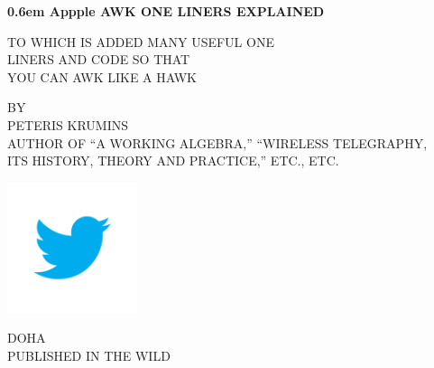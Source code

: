 \documentclass{book}
\begin{document}
\clearpage
\newcommand\nbvspace[1][3]{\vspace*{\stretch{#1}}}
\newcommand\nbstretchyspace{\spaceskip0.5em plus 0.25em minus 0.25em}
\newcommand{\nbtitlestretch}{\spaceskip0.6em}
\pagestyle{empty}
\begin{center}
\bfseries
\nbvspace[1]
\Huge
{\nbtitlestretch\huge
Appple AWK ONE LINERS EXPLAINED}
\nbvspace[1]

\normalsize
TO WHICH IS ADDED MANY USEFUL ONE\\
LINERS AND CODE SO THAT\\
YOU CAN AWK LIKE A HAWK
\nbvspace[1]

\small BY\\
\Large PETERIS KRUMINS\\[0.5em]
\footnotesize AUTHOR OF ``A WORKING ALGEBRA,'' ``WIRELESS TELEGRAPHY,\\
ITS HISTORY, THEORY AND PRACTICE,'' ETC., ETC.

\nbvspace[2]
\includegraphics[width=1.5in]{logo}
\nbvspace[3]


\normalsize
DOHA\\
\large
PUBLISHED IN THE WILD
\nbvspace[1]
\end{center}
\end{document}
